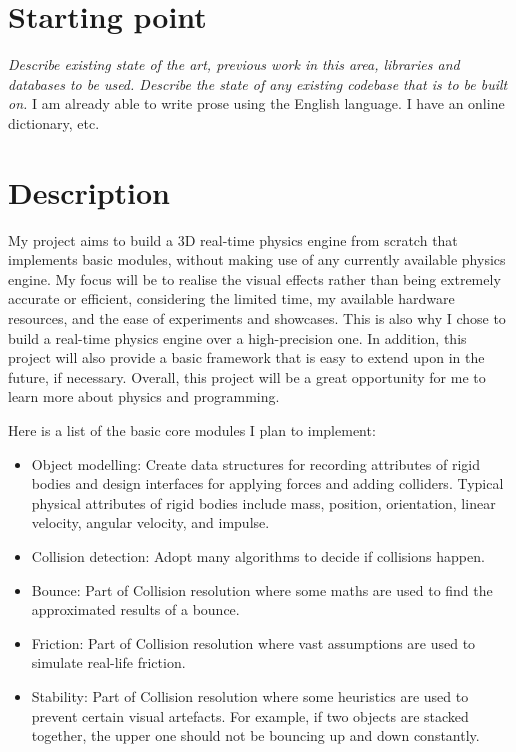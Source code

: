 \documentclass[12pt,a4paper,twoside]{article}
\begin{document}
\section*{Starting point}
\emph{Describe existing state of the art, previous work in this area,
libraries and databases to be used. Describe the state of any
existing codebase that is to be built on.}
I am already able to write prose using the English language. I have an
online dictionary, etc.
\section*{Description}

My project aims to build a 3D real-time physics engine from scratch that implements basic modules, 
without making use of any currently available physics engine.
My focus will be to realise the visual effects rather than being extremely accurate or efficient,
considering the limited time, my available hardware resources, and the ease of experiments and showcases.
This is also why I chose to build a real-time physics engine over a high-precision one.
In addition, this project will also provide a basic framework that is easy to extend upon in the future, if necessary.
Overall, this project will be a great opportunity for me to learn more about physics and programming.

Here is a list of the basic core modules I plan to implement:
\begin{itemize}
\item Object modelling: Create data structures for recording attributes of rigid bodies and design interfaces for applying forces and adding colliders.
Typical physical attributes of rigid bodies include mass, position, orientation, linear velocity, angular velocity, and impulse.
\item Collision detection: Adopt many algorithms to decide if collisions happen.
\item Bounce: Part of Collision resolution where some maths are used to find the approximated results of a bounce.
\item Friction: Part of Collision resolution where vast assumptions are used to simulate real-life friction.
\item Stability: Part of Collision resolution where some heuristics are used to prevent certain visual artefacts.
For example, if two objects are stacked together, the upper one should not be bouncing up and down constantly.
\end{itemize}
\end{document}
